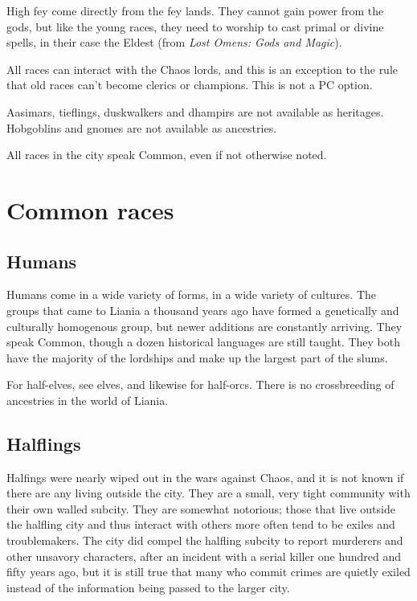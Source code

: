\documentclass{report}
\begin{document}
High fey come directly from the fey lands. They cannot gain power from the gods, but like the young
races, they need to worship to cast primal or divine spells, in their case
the Eldest (from \emph{Lost Omens: Gods and Magic}).

All races can interact with the Chaos lords, and this is an exception to the
rule that old races can't become clerics or champions. This is not a PC option.

Aasimars, tieflings, duskwalkers and dhampirs are not available as heritages.
Hobgoblins and gnomes are not available as ancestries.

All races in the city speak Common, even if not otherwise noted.

\section {Common races}

\subsection{Humans}

Humans come in a wide variety of forms, in a wide variety of cultures. The
groups that came to Liania a thousand years ago have formed a genetically and
culturally homogenous group, but newer additions are constantly arriving. They
speak Common, though a dozen historical languages are still taught. They both
have the majority of the lordships and make up the largest part of the slums.

For half-elves, see elves, and likewise for half-orcs. There is no crossbreeding
of ancestries in the world of Liania.

\subsection{Halflings}

Halfings were nearly wiped out in the wars against Chaos, and it is not known
if there are any living outside the city. They are a small, very tight community
with their own walled subcity. They are somewhat notorious; those that live
outside the halfling city and thus interact with others more often tend to be
exiles and troublemakers. The city did compel the halfling subcity to report
murderers and other unsavory characters, after an incident with a serial killer
one hundred and fifty years ago, but it is still true that many who commit crimes
are quietly exiled instead of the information being passed to the larger city.
\end{document}
